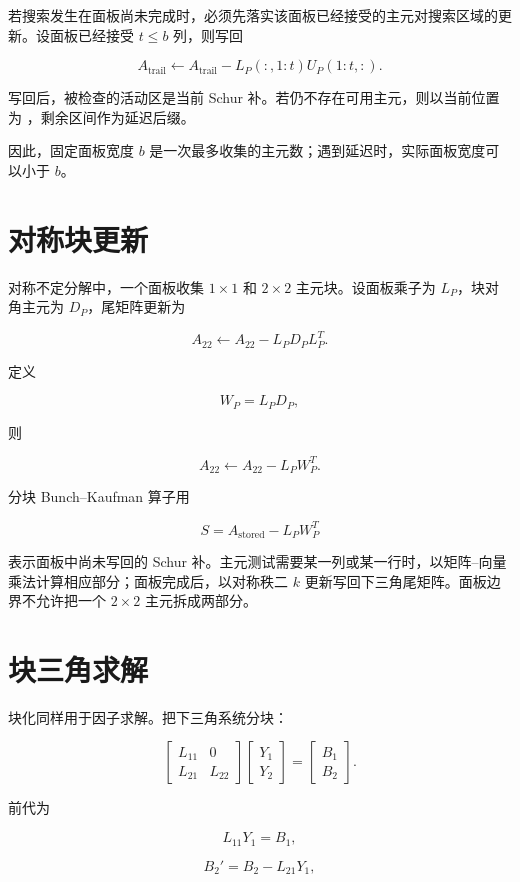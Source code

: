 若搜索发生在面板尚未完成时，必须先落实该面板已经接受的主元对搜索区域的更新。设面板已经接受 $t\le b$ 列，则写回

\[
A_{\mathrm{trail}}\leftarrow
A_{\mathrm{trail}}-L_P(:,1:t)U_P(1:t,:).
\]

写回后，被检查的活动区是当前 Schur 补。若仍不存在可用主元，则以当前位置为 ，剩余区间作为延迟后缀。

因此，固定面板宽度 $b$ 是一次最多收集的主元数；遇到延迟时，实际面板宽度可以小于 $b$。

\section{对称块更新}

对称不定分解中，一个面板收集 $1\times1$ 和 $2\times2$ 主元块。设面板乘子为 $L_P$，块对角主元为 $D_P$，尾矩阵更新为

\[
A_{22}\leftarrow A_{22}-L_PD_PL_P^T.
\]

定义

\[
W_P=L_PD_P,
\]

则

\[
A_{22}\leftarrow A_{22}-L_PW_P^T.
\]

分块 Bunch--Kaufman 算子用

\[
S=A_{\mathrm{stored}}-L_PW_P^T
\]

表示面板中尚未写回的 Schur 补。主元测试需要某一列或某一行时，以矩阵--向量乘法计算相应部分；面板完成后，以对称秩二 $k$ 更新写回下三角尾矩阵。面板边界不允许把一个 $2\times2$ 主元拆成两部分。

\section{块三角求解}

块化同样用于因子求解。把下三角系统分块：

\[
\begin{bmatrix}
L_{11}&0\\L_{21}&L_{22}
\end{bmatrix}
\begin{bmatrix}Y_1\\Y_2\end{bmatrix}
=
\begin{bmatrix}B_1\\B_2\end{bmatrix}.
\]

前代为

\[
L_{11}Y_1=B_1,
\]

\[
B_2' = B_2-L_{21}Y_1,
\]

